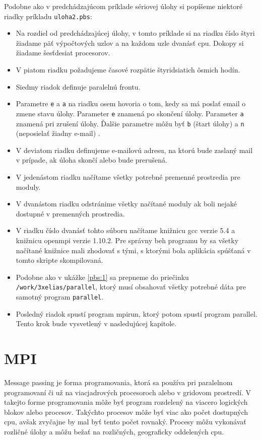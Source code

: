 Podobne ako v predchádzajúcom príklade sériovej úlohy si popíšeme niektoré riadky príkladu \texttt{uloha2.pbs}:
\begin{itemize}
\item
  Na rozdiel od predchádzajúcej úlohy, v tomto príklade si na riadku číslo štyri žiadame päť výpočtových uzlov a na každom uzle dvanásť \acrshort{cpu}.
  Dokopy si žiadame šesťdesiat procesorov.
\item
  V piatom riadku požadujeme časové rozpätie štyridsiatich ôsmich hodín.
\item
  Siedmy riadok definuje paralelnú frontu.
\item
  Parametre \texttt{e} a \texttt{a} na riadku osem hovoria o tom, kedy sa má poslať email o zmene stavu úlohy.
  Parameter \texttt{e} znamená po skončení úlohy.
  Parameter \texttt{a} znamená pri zrušení úlohy.
  Ďalšie parametre môžu byť \texttt{b} (štart úlohy) a \texttt{n} (neposielať žiadny e-mail) \cite{cmd:qsub}.
\item
  V deviatom riadku definujeme e-mailovú adresu, na ktorú bude zaslaný mail v prípade, ak úloha skončí alebo bude prerušená.
\item
  V jedenástom riadku načítame všetky potrebné premenné prostredia pre moduly.
\item
  V dvanástom riadku odstránime všetky načítané moduly ak boli nejaké dostupné v premenných prostredia.
\item
  V riadku číslo dvanásť tohto súboru načítame knižnicu gcc verzie 5.4 a knižnicu openmpi verzie 1.10.2.
  Pre správny beh programu by sa všetky načítané knižnice mali zhodovať s tými, s ktorými bola aplikácia spúšťaná v tomto skripte skompilovaná.
\item
  Podobne ako v ukážke \ref{pbs:1} sa prepneme do priečinku \texttt{/work/3xelias/parallel}, ktorý musí obsahovať všetky potrebné dáta
  pre samotný program \texttt{parallel}.
\item
  Posledný riadok spustí program mpirun, ktorý potom spustí program parallel. Tento krok bude vysvetlený v nasledujúcej kapitole.
\end{itemize}

\section{MPI}
Message passing je forma programovania, ktorá sa používa pri paralelnom programovaní či už na viacjadrových procesoroch alebo v gridovom prostredí.
V takejto forme programovania môže byť program rozdelený na viacero logických blokov alebo procesov.
Takýchto procesov môže byť viac ako počet dostupných \acrshort{cpu}, avšak zvyčajne by mal byť tento počet rovnaký.
Procesy môžu vykonávať rozličné úlohy a môžu bežať na rozličných, geograficky oddelených \acrshort{cpu}.

